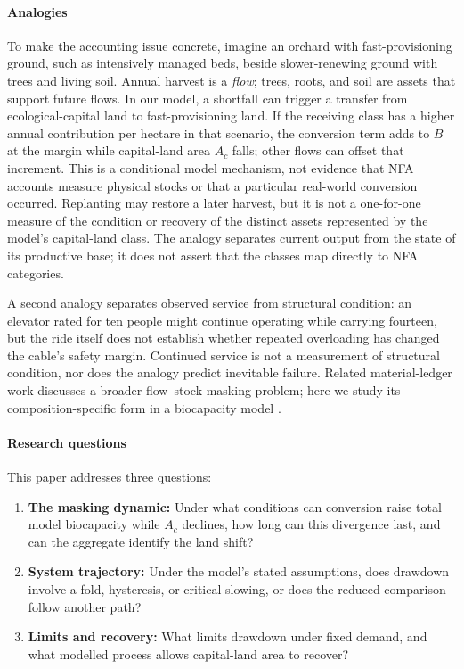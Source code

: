 \documentclass[preprint,12pt,authoryear]{elsarticle}
\begin{document}
\paragraph{Analogies} To make the accounting issue concrete, imagine an orchard with fast-provisioning ground, such as intensively managed beds, beside slower-renewing ground with trees and living soil. Annual harvest is a \emph{flow}; trees, roots, and soil are assets that support future flows. In our model, a shortfall can trigger a transfer from ecological-capital land to fast-provisioning land. If the receiving class has a higher annual contribution per hectare in that scenario, the conversion term adds to $B$ at the margin while capital-land area $A_c$ falls; other flows can offset that increment. This is a conditional model mechanism, not evidence that NFA accounts measure physical stocks or that a particular real-world conversion occurred. Replanting may restore a later harvest, but it is not a one-for-one measure of the condition or recovery of the distinct assets represented by the model's capital-land class. The analogy separates current output from the state of its productive base; it does not assert that the classes map directly to NFA categories.

A second analogy separates observed service from structural condition: an elevator rated for ten people might continue operating while carrying fourteen, but the ride itself does not establish whether repeated overloading has changed the cable's safety margin. Continued service is not a measurement of structural condition, nor does the analogy predict inevitable failure. Related material-ledger work discusses a broader flow--stock masking problem; here we study its composition-specific form in a biocapacity model \citep{Abaee2026c}.

\paragraph{Research questions} This paper addresses three questions:
\begin{enumerate}
  \item \textbf{The masking dynamic:} Under what conditions can conversion raise total model biocapacity while $A_c$ declines, how long can this divergence last, and can the aggregate identify the land shift?
  \item \textbf{System trajectory:} Under the model's stated assumptions, does drawdown involve a fold, hysteresis, or critical slowing, or does the reduced comparison follow another path?
  \item \textbf{Limits and recovery:} What limits drawdown under fixed demand, and what modelled process allows capital-land area to recover?
\end{enumerate}
\end{document}
